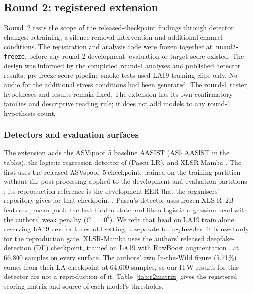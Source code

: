 \subsection{Round 2: registered extension}
\label{sec:r2design}
Round~2 tests the scope of the released-checkpoint findings through detector changes, retraining,
a silence-removal intervention and additional channel conditions. The registration and analysis code were
frozen together at \texttt{round2-freeze}, before any round-2 development, evaluation or target score existed.
The design was informed by the completed round-1 analyses and published detector results; pre-freeze
score-pipeline smoke tests used LA19 training clips only. No audio for the additional stress conditions
had been generated. The round-1 roster, hypotheses and results remain fixed. The extension has its own
confirmatory families and descriptive reading rule; it does not add models to any round-1 hypothesis count.

\subsubsection{Detectors and evaluation surfaces}
The extension adds the ASVspoof~5 baseline AASIST (AS5 AASIST in the tables), the logistic-regression detector of
\citet{pascu24_calibrated} (Pascu LR), and XLSR-Mamba \citep{xiao25_xlsrmamba}. The first uses the released ASVspoof~5
checkpoint, trained on the training partition without the post-processing applied to the development and
evaluation partitions \citep{wang25_asvspoof5_db}; its reproduction reference is the development EER that the
organisers' repository gives for that checkpoint \citep{asvspoof5_baselines}. Pascu's detector uses frozen XLS-R~2B
features \citep{babu21_xlsr}, mean-pools the last hidden state and fits a logistic-regression head with the authors'
weak penalty (\(C=10^{6}\)). We refit that head on LA19 train alone, reserving LA19 dev for threshold setting; a
separate train-plus-dev fit is used only for the reproduction gate. XLSR-Mamba uses the authors' released
deepfake-detection (DF) checkpoint, trained on LA19 with RawBoost augmentation \citep{tak22_rawboost}, at 66,800 samples
on every surface. The authors' own In-the-Wild figure (6.71\%) comes from their LA checkpoint at 64,600 samples, so our
ITW results for this detector are not a reproduction of it. Table~\ref{tab:r2matrix} gives the registered scoring
matrix and source of each model's thresholds.

